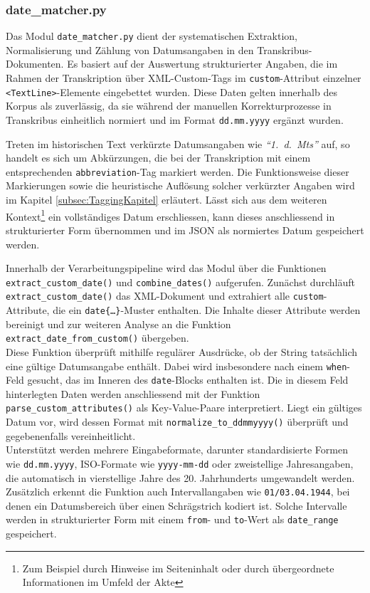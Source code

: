 \documentclass[12pt, a4paper, ngerman, bidi=default]{article}
\begin{document}
\subsubsection*{date\_matcher.py}\label{subsection:date_matcher}
Das Modul \texttt{date\_matcher.py} dient der systematischen Extraktion, Normalisierung und 
Zählung von Datumsangaben in den Transkribus-Dokumenten. Es basiert auf der 
Auswertung strukturierter Angaben, die im Rahmen der Transkription über XML-Custom-Tags im 
\texttt{custom}-Attribut einzelner \texttt{<TextLine>}-Elemente eingebettet wurden. Diese 
Daten gelten innerhalb des Korpus als zuverlässig, da sie während der manuellen Korrekturprozesse
in Transkribus einheitlich normiert und im Format \texttt{dd.mm.yyyy} ergänzt wurden.


Treten im historischen Text verkürzte Datumsangaben wie \textit{\enquote{1.~d.~Mts}} auf, so handelt
es sich um Abkürzungen, die bei der Transkription mit einem entsprechenden \texttt{abbreviation}-Tag
markiert werden. Die Funktionsweise dieser Markierungen sowie die heuristische Auflösung solcher 
verkürzter Angaben wird im Kapitel \ref{subsec:TaggingKapitel} erläutert. Lässt sich aus dem weiteren 
Kontext\footnote{Zum Beispiel durch Hinweise im Seiteninhalt oder durch übergeordnete Informationen im Umfeld der Akte} 
ein vollständiges Datum erschliessen, kann dieses anschliessend in strukturierter Form übernommen und im JSON als 
normiertes Datum gespeichert werden.


Innerhalb der Verarbeitungspipeline wird das Modul über die Funktionen \texttt{extract\_custom\_date()} und 
\texttt{combine\_dates()} aufgerufen. Zunächst durchläuft \texttt{extract\_custom\_date()} das XML-Dokument 
und extrahiert alle \texttt{custom}-Attribute, die ein \texttt{date\{…\}}-Muster enthalten. Die Inhalte dieser 
Attribute werden bereinigt und zur weiteren Analyse an die Funktion \texttt{extract\_date\_from\_custom()} übergeben.\\
Diese Funktion überprüft mithilfe regulärer Ausdrücke, ob der String tatsächlich eine gültige Datumsangabe enthält. 
Dabei wird insbesondere nach einem \texttt{when}-Feld gesucht, das im Inneren des \texttt{date}-Blocks enthalten ist. 
Die in diesem Feld hinterlegten Daten werden anschliessend mit der Funktion \texttt{parse\_custom\_attributes()} als 
Key-Value-Paare interpretiert. Liegt ein gültiges Datum vor, wird dessen Format mit \texttt{normalize\_to\_ddmmyyyy()} 
überprüft und gegebenenfalls vereinheitlicht.
\\
Unterstützt werden mehrere Eingabeformate, darunter standardisierte Formen wie \texttt{dd.mm.yyyy}, ISO-Formate 
wie \texttt{yyyy-mm-dd} oder zweistellige Jahresangaben, die automatisch in vierstellige Jahre des 20.
Jahrhunderts umgewandelt werden. Zusätzlich erkennt die Funktion auch Intervallangaben wie \texttt{01/03.04.1944}, 
bei denen ein Datumsbereich über einen Schrägstrich kodiert ist. Solche Intervalle werden in strukturierter Form mit 
einem \texttt{from}- und \texttt{to}-Wert als \texttt{date\_range} gespeichert.
\end{document}
